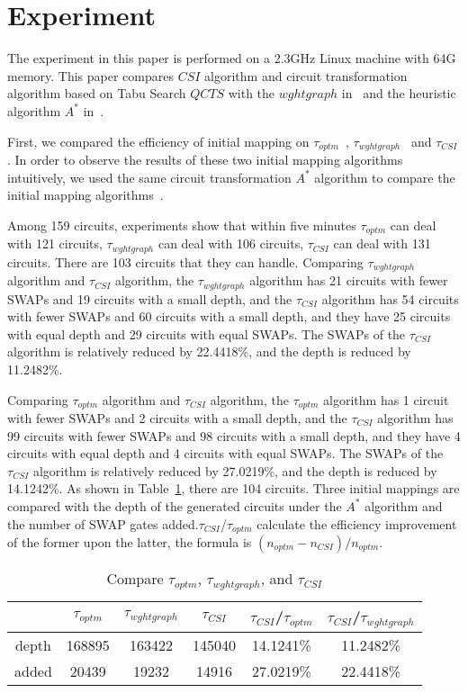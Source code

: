 \documentclass[runningheads]{llncs}
\begin{document}
\section{Experiment}
\label{Experiment}
The experiment in this paper is performed on a 2.3GHz Linux machine with 64G memory. 
This paper compares  $CSI$  algorithm 
and circuit transformation algorithm based on Tabu Search $QCTS$
with the $wghtgraph$ in~\cite{2020Qubit} and the heuristic algorithm $ A^{*}$  in~\cite{Zulehner2017}.
 
First, we compared the efficiency of initial mapping on $\tau_{optm}$~\cite{Zulehner2017}, 
$\tau_{wghtgraph}$~\cite{2020Qubit} and $\tau_{CSI}$.
In order to observe the results of these two initial mapping algorithms intuitively, 
we used the same circuit transformation $ A^{*}$ algorithm to 
compare the initial mapping algorithms~\cite{Zulehner2017}.

Among 159 circuits,
experiments show that within five minutes $\tau_{optm}$ can deal with 121 circuits, 
$\tau_{wghtgraph}$  can deal with 106 circuits, $\tau_{CSI}$  can deal with  131 circuits.
There are 103 circuits that they can handle.
Comparing $\tau_{wghtgraph}$ algorithm and $\tau_{CSI}$ algorithm, 
the $\tau_{wghtgraph}$ algorithm has 21 circuits with fewer SWAPs and 19 circuits with a small depth,
and the $\tau_{CSI}$ algorithm has 54 circuits with fewer SWAPs and 60 circuits with a small depth, 
and they have 25 circuits with equal depth and  29 circuits with equal SWAPs. 
The SWAPs of the $\tau_{CSI}$ algorithm is relatively reduced by 22.4418\%, 
and the depth is reduced by 11.2482\%.

Comparing $\tau_{optm}$ algorithm and $\tau_{CSI}$ algorithm, 
the $\tau_{optm}$ algorithm has 1 circuit with fewer SWAPs and 2 circuits with a small depth,
and the $\tau_{CSI}$ algorithm has 99 circuits with fewer SWAPs and 98 circuits with a small depth, 
and they have 4 circuits with equal depth and  4 circuits with equal SWAPs.
The SWAPs of the $\tau_{CSI}$ algorithm is relatively reduced by 27.0219\%, and the depth is reduced by 14.1242\%.
As shown in Table~\ref{tab1}, there are 104 circuits. 
Three initial mappings are compared with the depth of the generated circuits under the $A^{*}$ algorithm 
and the number of SWAP gates added.$\tau_{CSI}$/$\tau_{optm}$  calculate the efficiency improvement
 of the former upon the latter, the formula is $(n_{optm}-n_{CSI})/n_{optm}$.
\begin{table}
	\begin{center}  
	\begin{tabular}{|c|c|c|c|c|c|}
	\hline
	    	&  $\tau_{optm}$ & $\tau_{wghtgraph}$ &$\tau_{CSI}$& $\tau_{CSI}$/$\tau_{optm}$ & $\tau_{CSI}$/$\tau_{wghtgraph}$\\
	\hline
	 depth 	 &	168895	&   163422	&  145040 	& 14.1241\%  &11.2482\%   \\
	\hline
	 added 	&	20439	&  19232 	&  14916 & 27.0219\% 	&  22.4418\%  \\
	\hline
	\end{tabular} 
	\end{center} 
	\caption{Compare $\tau_{optm}$, $\tau_{wghtgraph}$, and $\tau_{CSI}$ }
	\label{tab1}
	\end{table}
\end{document}
